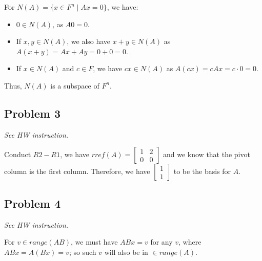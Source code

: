 \documentclass[11pt]{article}
\providecommand{\qbm}[1]{\begin{bmatrix} #1 \end{bmatrix}}
\begin{document}
For $N(A) = \{x \in F^n \mid Ax = 0 \}$, we have:

\begin{itemize}
    \item $0 \in N(A)$, as $A0 = 0$.
    \item If $x, y \in N(A)$, we also have $x + y \in N(A)$ as $A(x + y) = Ax + Ay = 0 + 0 = 0$.
    \item If $x \in N(A)$ and $c \in F$, we have $cx \in N(A)$ as $A(cx) = cAx = c \cdot 0 = 0$.
\end{itemize}

Thus, $N(A)$ is a subspace of $F^n$.

\subsection*{Problem 3}
\textit{See HW instruction.}\newline

Conduct $R2 - R1$, we have $rref(A) = \qbm{1 & 2 \\ 0 & 0}$ and we know that the pivot column is the first column. Therefore, we have $\qbm{1 \\ 1}$ to be the basis for $A$.

\subsection*{Problem 4}
\textit{See HW instruction.}\newline

For $v \in range(AB)$, we must have $ABx = v$ for any $v$, where $ABx = A(Bx) = v$; so such $v$ will also be in $\in range(A)$.
\end{document}
